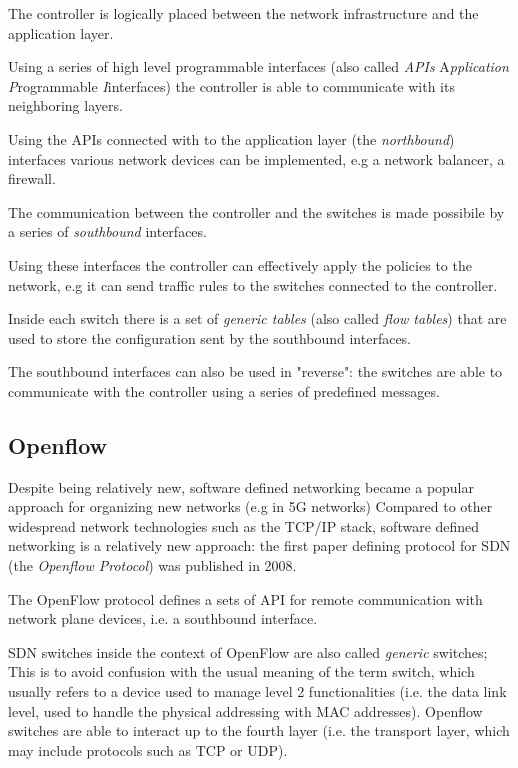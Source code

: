 The controller is logically placed between the network infrastructure and the application layer.

Using a series of high level programmable interfaces  (also called \textit{APIs} A\textit{pplication} \textit{P}rogrammable \textit{I}interfaces) the controller is able to communicate with its neighboring layers.


Using the APIs connected with to the application layer (the \textit{northbound}) interfaces various network devices can be implemented, e.g a network balancer, a firewall.

The communication between the controller and the switches is made possibile by a series of \textit{southbound} interfaces.

Using these interfaces the controller can effectively apply the policies to the network, e.g it can send traffic rules to the switches connected to the controller.

Inside each switch there is a set of \textit{generic tables} (also called \textit{flow tables}) that are used to store the configuration sent by the southbound interfaces.

The southbound interfaces can also be used in "reverse": the switches are able to communicate with the controller using a series of predefined messages.



\subsection{Openflow}
Despite being relatively new, software defined networking became a popular approach for organizing new networks (e.g in 5G networks)
Compared to other widespread network technologies such as the TCP/IP stack, software defined networking is a relatively new approach: the first paper defining protocol for SDN (the \textit{Openflow Protocol}) was published in 2008.

The OpenFlow protocol defines a sets of API for remote communication with network plane devices, i.e. a southbound interface.


SDN switches inside the context of OpenFlow are also called \textit{generic} switches;
This is to avoid confusion with the usual meaning of the term switch, which usually refers to a device used to manage level 2 functionalities (i.e. the data link level, used to handle the physical addressing with MAC addresses). 
Openflow switches are able to interact up to the fourth layer (i.e. the transport layer, which may include protocols such as TCP or UDP).


